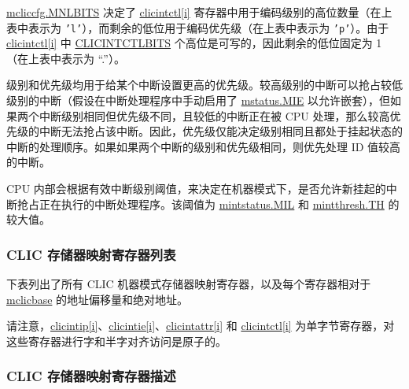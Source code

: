 \documentclass[main\_\_CN.tex]{subfiles}
\begin{document}
\hyperref[fielddesc:MCLICCFG_MNLBITS]{mcliccfg.MNLBITS} 决定了 \hyperref[regdesc:MCLICINTCTL_REG_i]{clicintctl[i]} 寄存器中用于编码级别的高位数量（在上表中表示为 \texttt{'l'}），而剩余的低位用于编码优先级（在上表中表示为 \texttt{'p'}）。由于 \hyperref[regdesc:MCLICINTCTL_REG_i]{clicintctl[i]} 中 \hyperref[fielddesc:CLICINFO_CLICINTCTLBITS]{CLICINTCTLBITS} 个高位是可写的，因此剩余的低位固定为 1（在上表中表示为 ``.”）。

级别和优先级均用于给某个中断设置更高的优先级。较高级别的中断可以抢占较低级别的中断（假设在中断处理程序中手动启用了 \hyperref[fielddesc:MSTATUSMIE]{mstatus.MIE} 以允许嵌套），但如果两个中断级别相同但优先级不同，且较低的中断正在被 CPU 处理，那么较高优先级的中断无法抢占该中断。因此，优先级仅能决定级别相同且都处于挂起状态的中断的处理顺序。如果如果两个中断的级别和优先级相同，则优先处理 ID 值较高的中断。


CPU 内部会根据有效中断级别阈值，来决定在机器模式下，是否允许新挂起的中断抢占正在执行的中断处理程序。该阈值为 \hyperref[fielddesc:MINTSTATUS_MIL]{{mintstatus.MIL}} 和 \hyperref[fielddesc:MINTTHRESH_TH]{{mintthresh.TH}} 的较大值。


\hypertarget{riscvcpu-clic-memmap-reg-summ}{}
\subsubsection{CLIC 存储器映射寄存器列表}
\label{sec:riscvcpu-clic-memmap-reg-summ}

下表列出了所有 CLIC 机器模式存储器映射寄存器，以及每个寄存器相对于 \hyperref[fielddesc:MCLICBASE]{mclicbase} 的地址偏移量和绝对地址。

请注意，\hyperref[regdesc:MCLICINTIP_REG_i]{clicintip[i]}、\hyperref[regdesc:MCLICINTIE_REG_i]{clicintie[i]}、\hyperref[regdesc:MCLICINTATTR_REG_i]{clicintattr[i]} 和 \hyperref[regdesc:MCLICINTCTL_REG_i]{clicintctl[i]} 为单字节寄存器，对这些寄存器进行字和半字对齐访问是原子的。





\hypertarget{riscvcpu-clic-memmap-reg}{}
\subsubsection{CLIC 存储器映射寄存器描述}
\label{sec:riscvcpu-clic-memmap-reg}
\end{document}
